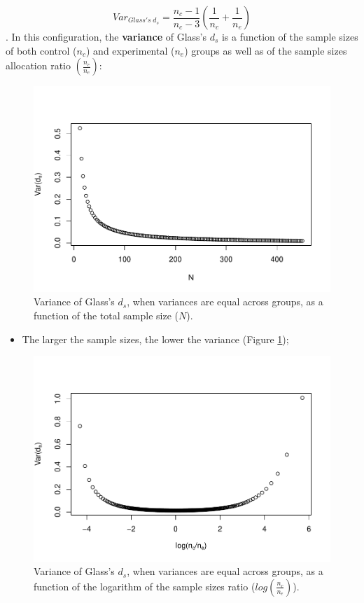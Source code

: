 \documentclass[
  english,
  man,mask]{apa6}
\providecommand{\tightlist}{%
  \setlength{\itemsep}{0pt}\setlength{\parskip}{0pt}}
\begin{document}
\[Var_{Glass's \; d_s} = \frac{n_c-1}{n_c-3} \left( \frac{1}{n_c}+\frac{1}{n_e}\right)\]. In this configuration, the \textbf{variance} of Glass's \(d_s\) is a function of the sample sizes of both control (\(n_c\)) and experimental (\(n_e\)) groups as well as of the sample sizes allocation ratio \(\left( \frac{n_c}{n_e}\right)\):

\begin{figure}
\centering
\includegraphics{Theoretical-Variance-of-all-estimators-as-a-function-of-population-parameters_files/figure-latex/varglassNsize2-1.pdf}
\caption{\label{fig:varglassNsize2}Variance of Glass's \(d_s\), when variances are equal across groups, as a function of the total sample size (\(N\)).}
\end{figure}

\begin{itemize}
\tightlist
\item
  The larger the sample sizes, the lower the variance (Figure \ref{fig:varglassNsize2});
\end{itemize}

\begin{figure}
\centering
\includegraphics{Theoretical-Variance-of-all-estimators-as-a-function-of-population-parameters_files/figure-latex/varglasshomNratio2-1.pdf}
\caption{\label{fig:varglasshomNratio2}Variance of Glass's \(d_s\), when variances are equal across groups, as a function of the logarithm of the sample sizes ratio (\(log\left(\frac{n_c}{n_e} \right)\)).}
\end{figure}
\end{document}
